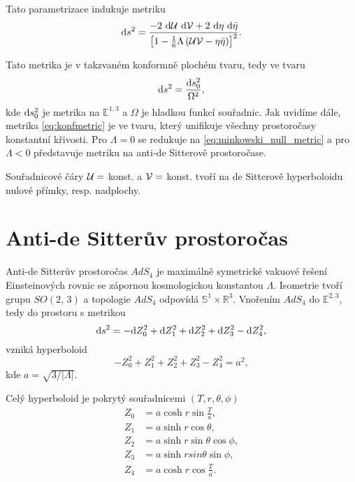Tato parametrizace indukuje metriku
\begin{equation}
     \label{eq:konfmetric}
     \mathrm{d} s^2 = \frac{-2 ~ \mathrm{d} \mathcal{U} ~ \mathrm{d} \mathcal{V} + 2 ~ \mathrm{d} \eta ~ \mathrm{d} \bar{\eta}}{\left[1-\tfrac{1}{6} \Lambda \left(\mathcal{U} \mathcal{V} - \eta \bar{\eta}\right)\right]^2}.
\end{equation}

Tato metrika je v takzvaném konformně plochém tvaru, tedy ve tvaru
\begin{equation}
     \mathrm{d} s^2 = \frac{\mathrm{d} s_0^2}{\Omega^2},
\end{equation}
kde $\mathrm{d} s_0^2$ je metrika na $\mathbb{E}^{1,3}$ a $\Omega$ je hladkou funkcí souřadnic. Jak uvidíme dále,
metrika \eqref{eq:konfmetric} je ve tvaru, který unifikuje všechny prostoročasy konstantní křivosti.
Pro $\Lambda = 0$ se redukuje na \eqref{eq:minkowski_null_metric} a pro $\Lambda < 0$ představuje metriku na
anti-de Sitterově prostoročase.

Souřadnicové čáry $\mathcal{U} =$ konst. a $\mathcal{V} =$ konst. tvoří na de Sitterově hyperboloidu nulové
přímky, resp. nadplochy.

\section{Anti-de Sitterův prostoročas}

Anti-de Sitterův prostoročas $AdS_4$ je maximálně symetrické vakuové řešení Einsteinových rovnic se zápornou
kosmologickou konstantou $\Lambda$. Isometrie tvoří grupu $SO(2,\,3)$ a topologie $AdS_4$ odpovídá $\mathbb{S}^1 \times \mathbb{R}^3$.
Vnořením $AdS_4$ do $\mathbb{E}^{2,3}$, tedy do prostoru s metrikou
\begin{equation}
     \label{eq:AdS5DMetric}
     \mathrm{d} s^2 = -\mathrm{d} Z_0^2 + \mathrm{d} Z_1^2 + \mathrm{d} Z_2^2 + \mathrm{d} Z_3^2 - \mathrm{d} Z_4^2,
\end{equation}
vzniká hyperboloid
\begin{equation}
     \label{eq:AdS_hyperboloid}
     -Z_0^2 + Z_1^2 + Z_2^2 + Z_3^2 - Z_4^2 = a^2,
\end{equation}
kde $a = \sqrt{3/|\Lambda|}$.

Celý hyperboloid je pokrytý souřadnicemi $(T, r, \theta, \phi)$
\begin{equation}
     \begin{split}
          Z_0 &= a \cosh r \sin \frac{T}{a}, \\
          Z_1 &= a \sinh r \cos \theta, \\
          Z_2 &= a \sinh r \sin \theta \cos \phi, \\
          Z_3 &= a \sinh r sin \theta \sin \phi, \\
          Z_4 &= a \cosh r \cos \frac{T}{a}.
     \end{split}
\end{equation}

